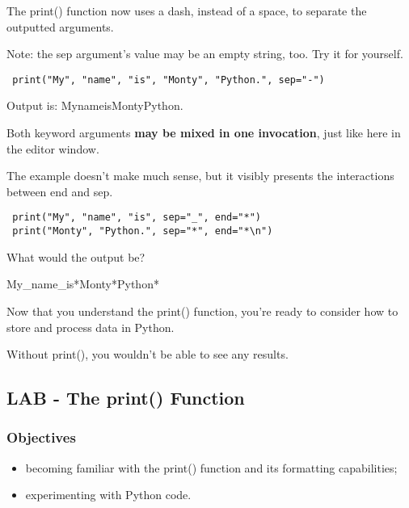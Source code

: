 \documentclass[a4paper,10pt]{article}
\begin{document}
The {\selectfont print()} function now uses a dash, instead of a space, to separate the outputted arguments.
\newline

Note: the {\selectfont sep} argument's value may be an empty string, too. Try it for yourself.

\begin{verbatim}
 print("My", "name", "is", "Monty", "Python.", sep="-")
\end{verbatim}


Output is:
{\selectfont MynameisMontyPython.}
\newline




Both keyword arguments \textbf{may be mixed in one invocation}, just like here in the editor window.
\newline

The example doesn't make much sense, but it visibly presents the interactions between {\selectfont end} and {\selectfont sep}.

\begin{verbatim}
 print("My", "name", "is", sep="_", end="*")
 print("Monty", "Python.", sep="*", end="*\n")
\end{verbatim}


What would the output be?
\newline

{\selectfont My\_name\_is*Monty*Python*}
\newline

Now that you understand the {\selectfont print()} function, you're ready to consider how to store and process data in Python.
\newline

Without {\selectfont print()}, you wouldn't be able to see any results.

\subsection{LAB - The print() Function}
\subsubsection{Objectives}
\begin{itemize}
 \item becoming familiar with the {\selectfont print()} function and its formatting capabilities;
 \item experimenting with Python code.
\end{itemize}
\end{document}
